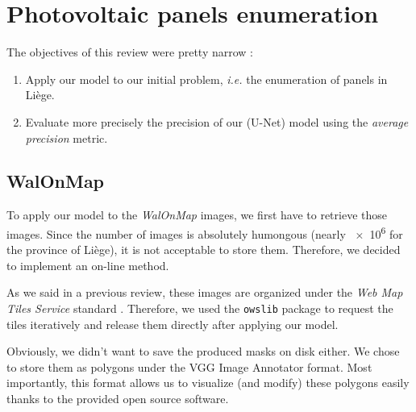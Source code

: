 \documentclass[a4paper, 12pt]{article}
\begin{document}
\newpage

\section{Photovoltaic panels enumeration}

The objectives of this review were pretty narrow : 

\begin{enumerate}[noitemsep]
    \item Apply our model to our initial problem, \emph{i.e.} the enumeration of panels in Liège.
    \item Evaluate more precisely the precision of our (U-Net) model using the \emph{average precision} metric.
\end{enumerate}

\subsection{WalOnMap}

To apply our model to the \emph{WalOnMap} \cite{walonmap} images, we first have to retrieve those images. Since the number of images is absolutely humongous (nearly \num{e6} for the province of Liège), it is not acceptable to store them. Therefore, we decided to implement an on-line method.

As we said in a previous review, these images are organized under the \emph{Web Map Tiles Service} standard \cite{maso2010opengis}. Therefore, we used the \texttt{owslib} package to request the tiles iteratively and release them directly after applying our model.

Obviously, we didn't want to save the produced masks on disk either. We chose to store them as polygons under the VGG Image Annotator \cite{dutta2019via} format. Most importantly, this format allows us to visualize (and modify) these polygons easily thanks to the provided open source software.
\end{document}
